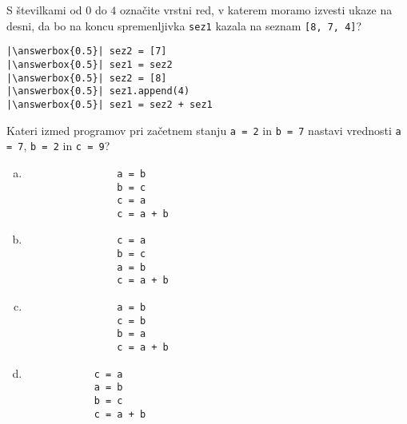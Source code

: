 \documentclass[arhiv, 10pt]{../izpit}
\newcommand{\inlinepy}[1]{\texttt{#1}}
\newcommand{\answerbox}[1]{\framebox{\vphantom{\large M}\hspace{#1cm}}}
\begin{document}
        \naloga*
        \begin{multicols}{2}
        \noindent 
        S številkami od $0$ do $4$ označite vrstni red, v katerem moramo izvesti ukaze na desni, da bo na koncu spremenljivka \inlinepy{sez1} kazala na seznam \inlinepy{[8, 7, 4]}?
    
        \columnbreak
        \noindent
        \begin{verbatim}
|\answerbox{0.5}| sez2 = [7]
|\answerbox{0.5}| sez1 = sez2
|\answerbox{0.5}| sez2 = [8]
|\answerbox{0.5}| sez1.append(4)
|\answerbox{0.5}| sez1 = sez2 + sez1

        \end{verbatim}
        \end{multicols}
    
            
        \naloga*
        
        Kateri izmed programov pri začetnem stanju
            \inlinepy{a = 2} in
            \inlinepy{b = 7}
        nastavi vrednosti
            \inlinepy{a = 7},
            \inlinepy{b = 2} in
            \inlinepy{c = 9}?
    
        \begin{multicols}{4}
        \begin{enumerate}[(a)]
\item 
                \begin{verbatim}
                a = b
                b = c
                c = a
                c = a + b
                \end{verbatim}
            
\item 
                \begin{verbatim}
                c = a
                b = c
                a = b
                c = a + b
                \end{verbatim}
            
\item 
                \begin{verbatim}
                a = b
                c = b
                b = a
                c = a + b
                \end{verbatim}
            
\item 
            \begin{verbatim}
            c = a
            a = b
            b = c
            c = a + b
            \end{verbatim}
        
\end{enumerate}

        \end{multicols}
    
\end{document}

